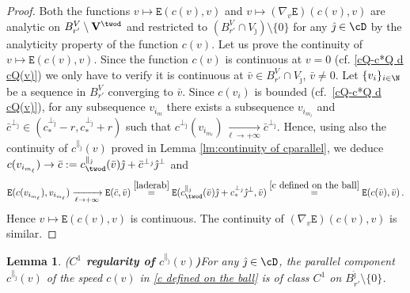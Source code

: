 \documentclass[11pt,a4paper,reqno]{article}
\numberwithin{equation}{section}
\newtheorem{lemma}[theorem]{Lemma}
\theoremstyle{definition}
\begin{document}
\begin{proof}
    Both the functions $v\mapsto {\mathtt E}(c(v),v)$ and $v\mapsto (\nabla_v {\mathtt E}) (c(v),v)$ are analytic on $B_{r'}^V\setminus {\bf V}^{\twod}$ and restricted to $ (B_{r'}^V\cap V_{\hat \jmath})\setminus\{0\}$ for any ${\hat \jmath} \in \cD $ by the analyticity property of the function $ c(v) $.
     Let us prove the continuity of $v\mapsto {\mathtt E} (c(v),v)$.
    Since the function $c(v)$ is continuous at $v=0$ (cf. \eqref{cQ-c*Q d cQ(v)}) we only have to verify it is continuous
    at $ \bar v \in B_{r'}^V\cap V_{\hat \jmath}  $, $ \bar v \neq 0 $.
        Let $\{v_i\}_{i\in \N}$ be a sequence in $B_{r'}^V$ converging to $\bar v $. Since $c(v_i)$
        is bounded (cf.~\eqref{cQ-c*Q d cQ(v)}), 
        for any subsequence $v_{i_m}$ there exists a subsequence $v_{i_{m_\ell}}$ and $\bar c^{\bot_{\hat \jmath}} \in (c_*^{\bot_{\hat \jmath}}-r,c_*^{\bot_{\hat \jmath}}+r) $ such that
        $ c^{\bot_{\hat \jmath}}(v_{i_{m_\ell}})
        \xrightarrow[\ell\to+\infty]{}  
        \bar c^{\bot_{\hat \jmath}}$.
        Hence,  
        using also the continuity 
        of $ c^{\parallel_{\hat \jmath}} (v) $ proved in  Lemma \ref{lm:continuity of cparallel}, we deduce
$ c(v_{i_{m_\ell}})     \to   \bar c := c^{\parallel_{\hat \jmath}}_{\twod}(\bar v)\hat\jmath +\bar c^{\bot_{\hat \jmath}} \hat\jmath^\bot $ and 
        $$
   {\mathtt E} (c(v_{i_{m_\ell}}),v_{i_{m_\ell}}) \xrightarrow[\ell\to+\infty]{}  {\mathtt E} (\bar c,\bar v) \stackrel{\eqref{laderab}} = 
{\mathtt E} (c^{\parallel_{\hat \jmath}}_{\twod}(\bar v)\hat\jmath+c_*^{\bot_{\hat \jmath}}\hat\jmath^\bot ,\bar v) \stackrel{\eqref{c defined on the ball}} 
= {\mathtt E}(c(\bar v), \bar v) \, .
        $$
Hence $v\mapsto {\mathtt E} (c(v),v)$ is continuous. 
The 
continuity of  $ (\nabla_v {\mathtt E}) (c(v),v)$ is similar. 
\end{proof}

\begin{lemma}{(\bf $C^1$ regularity of $c^{\parallel_{\hat \jmath}}(v) $)}\label{lm:C1 regularity of cparallel}
For any $ {\hat \jmath} \in \cD$,
    the parallel component $c^{\parallel_{\hat \jmath}}(v)$ of the speed $ c(v) $ in \eqref{c defined on the ball}  is of class $C^1$ on $B_{r'}^{\hat \jmath}\setminus\{0\}$.
\end{lemma}
\end{document}
